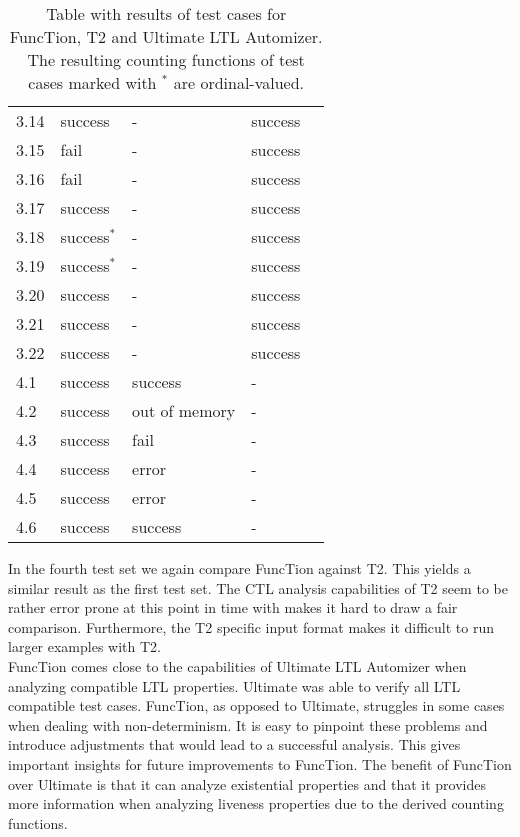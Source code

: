 \documentclass[11pt,a4paper,titlepage]{article}
\theoremstyle{definition}
\begin{document}
\begin{table}
\begin{tabular}{l l l l l}
    3.14 & success & - & success \\
    3.15 & fail & - & success \\
    3.16 & fail & - & success \\
    3.17 & success & - & success \\
    3.18 & success$^*$  & - & success \\
    3.19 & success$^*$  & - & success \\
    3.20 & success & - & success \\
    3.21 & success & - & success \\
    3.22 & success & - & success \\
    \hline
    4.1 & success & success & - \\
    4.2 & success & out of memory & - \\
    4.3 & success & fail & - \\
    4.4 & success & error & - \\
    4.5 & success & error & - \\
    4.6 & success & success & - \\
\end{tabular}
\caption{Table with results of test cases for FuncTion, T2 and Ultimate LTL Automizer. 
    The resulting counting functions of test cases marked with $^*$ are ordinal-valued.}
\label{tbl:test_cases_results}
\end{table}

In the fourth test set we again compare FuncTion against T2. This yields a similar result as the first test set. 
The CTL analysis capabilities of T2 seem to be rather error prone at this 
point in time with makes it hard to draw a fair comparison.
Furthermore, the T2 specific input format makes it difficult to run larger examples with T2.\\

FuncTion comes close to the capabilities of Ultimate LTL Automizer when analyzing compatible LTL properties. 
Ultimate was able to verify all LTL compatible test cases. 
FuncTion, as opposed to Ultimate, struggles in some cases when dealing with non-determinism.  
It is easy to pinpoint these problems and introduce adjustments that
would lead to a successful analysis. This gives important insights for future improvements to FuncTion. 
The benefit of FuncTion over Ultimate is that it can analyze existential properties and that 
it provides more information when analyzing liveness properties due to the derived counting functions.\\
\end{document}

